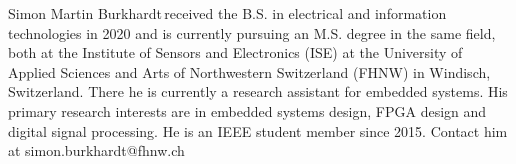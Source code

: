 \documentclass[lettersize,journal]{IEEEtran}
\begin{document}
\begin{IEEEbiography}{Simon Martin Burkhardt}{\,}received the B.S. in electrical and information technologies in 2020 and is currently pursuing an M.S. degree in the same field, both at the Institute of Sensors and Electronics (ISE) at the University of Applied Sciences and Arts of Northwestern Switzerland (FHNW) in Windisch, Switzerland. There he is currently a research assistant for embedded systems.
His primary research interests are in embedded systems design, FPGA design and digital signal processing.
He is an IEEE student member since 2015.
Contact him at simon.burkhardt@fhnw.ch
\end{IEEEbiography}


\vfill
\end{document}

